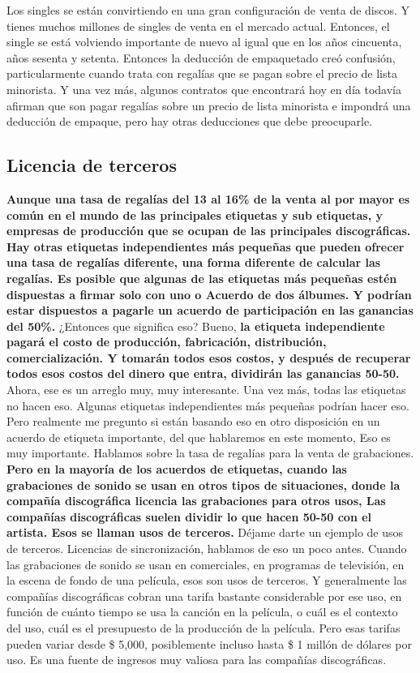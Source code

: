 \documentclass[10pt]{book}
\begin{document}
Los singles se están convirtiendo en una gran configuración de venta de discos. Y tienes muchos millones de singles de venta en el mercado actual. Entonces, el single se está volviendo importante de nuevo al igual que en los años cincuenta, años sesenta y setenta. Entonces la deducción de empaquetado creó confusión, particularmente cuando trata con regalías que se pagan sobre el precio de lista minorista. Y una vez más, algunos contratos que encontrará hoy en día todavía afirman que son pagar regalías sobre un precio de lista minorista e impondrá una deducción de empaque, pero hay otras deducciones que debe preocuparle.
\subsection{Licencia de terceros}
\textbf{Aunque una tasa de regalías del 13 al 16\% de la venta al por mayor es común en el mundo de las principales etiquetas y sub etiquetas, y empresas de producción que se ocupan de las principales discográficas. Hay otras etiquetas independientes más pequeñas que pueden ofrecer una tasa de regalías diferente, una forma diferente de calcular las regalías. Es posible que algunas de las etiquetas más pequeñas estén dispuestas a firmar solo con uno o Acuerdo de dos álbumes. Y podrían estar dispuestos a pagarle un acuerdo de participación en las ganancias del 50\%.} ¿Entonces que significa eso? Bueno, \textbf{la etiqueta independiente pagará el costo de producción, fabricación, distribución, comercialización. Y tomarán todos esos costos, y después de recuperar todos esos costos del dinero que entra, dividirán las ganancias 50-50.} Ahora, ese es un arreglo muy, muy interesante. Una vez más, todas las etiquetas no hacen eso. Algunas etiquetas independientes más pequeñas podrían hacer eso. Pero realmente me pregunto si están basando eso en otro disposición en un acuerdo de etiqueta importante, del que hablaremos en este momento, Eso es muy importante. Hablamos sobre la tasa de regalías para la venta de grabaciones. \textbf{Pero en la mayoría de los acuerdos de etiquetas, cuando las grabaciones de sonido se usan en otros tipos de situaciones, donde la compañía discográfica licencia las grabaciones para otros usos, Las compañías discográficas suelen dividir lo que hacen 50-50 con el artista. Esos se llaman usos de terceros.} Déjame darte un ejemplo de usos de terceros. Licencias de sincronización, hablamos de eso un poco antes. Cuando las grabaciones de sonido se usan en comerciales, en programas de televisión, en la escena de fondo de una película, esos son usos de terceros. Y generalmente las compañías discográficas cobran una tarifa bastante considerable por ese uso, en función de cuánto tiempo se usa la canción en la película, o cuál es el contexto del uso, cuál es el presupuesto de la producción de la película. Pero esas tarifas pueden variar desde \$ 5,000, posiblemente incluso hasta \$ 1 millón de dólares por uso. Es una fuente de ingresos muy valiosa para las compañías discográficas.\\
\end{document}
